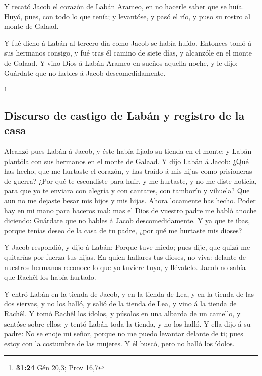  Y recató Jacob el corazón de Labán Arameo, en no hacerle
saber que se huía.  Huyó, pues, con todo lo que tenía; y
levantóse, y pasó el río, y puso su rostro al monte de Galaad.

 Y fué dicho á Labán al tercero día como Jacob se había
huído.  Entonces tomó á sus hermanos consigo, y fué tras
él camino de siete días, y alcanzóle en el monte de Galaad.
 Y vino Dios á Labán Arameo en sueños aquella noche, y le
dijo: Guárdate que no hables á Jacob descomedidamente.

\footnote{\textbf{31:24} Gén 20,3; Prov 16,7}

\hypertarget{discurso-de-castigo-de-labuxe1n-y-registro-de-la-casa}{%
\subsection{Discurso de castigo de Labán y registro de la
casa}\label{discurso-de-castigo-de-labuxe1n-y-registro-de-la-casa}}

 Alcanzó pues Labán á Jacob, y éste había fijado su
tienda en el monte: y Labán plantóla con sus hermanos en el monte de
Galaad.  Y dijo Labán á Jacob: ¿Qué has hecho, que me
hurtaste el corazón, y has traído á mis hijas como prisioneras de
guerra?  ¿Por qué te escondiste para huir, y me hurtaste,
y no me diste noticia, para que yo te enviara con alegría y con
cantares, con tamborín y vihuela?  Que aun no me dejaste
besar mis hijos y mis hijas. Ahora locamente has hecho. 
Poder hay en mi mano para haceros mal: mas el Dios de vuestro padre me
habló anoche diciendo: Guárdate que no hables á Jacob descomedidamente.
 Y ya que te ibas, porque tenías deseo de la casa de tu
padre, ¿por qué me hurtaste mis dioses?

 Y Jacob respondió, y dijo á Labán: Porque tuve miedo;
pues dije, que quizá me quitarías por fuerza tus hijas. 
En quien hallares tus dioses, no viva: delante de nuestros hermanos
reconoce lo que yo tuviere tuyo, y llévatelo. Jacob no sabía que Rachêl
los había hurtado.

 Y entró Labán en la tienda de Jacob, y en la tienda de
Lea, y en la tienda de las dos siervas, y no los halló, y salió de la
tienda de Lea, y vino á la tienda de Rachêl.  Y tomó
Rachêl los ídolos, y púsolos en una albarda de un camello, y sentóse
sobre ellos: y tentó Labán toda la tienda, y no los halló.
 Y ella dijo á su padre: No se enoje mi señor, porque no
me puedo levantar delante de ti; pues estoy con la costumbre de las
mujeres. Y él buscó, pero no halló los ídolos.

